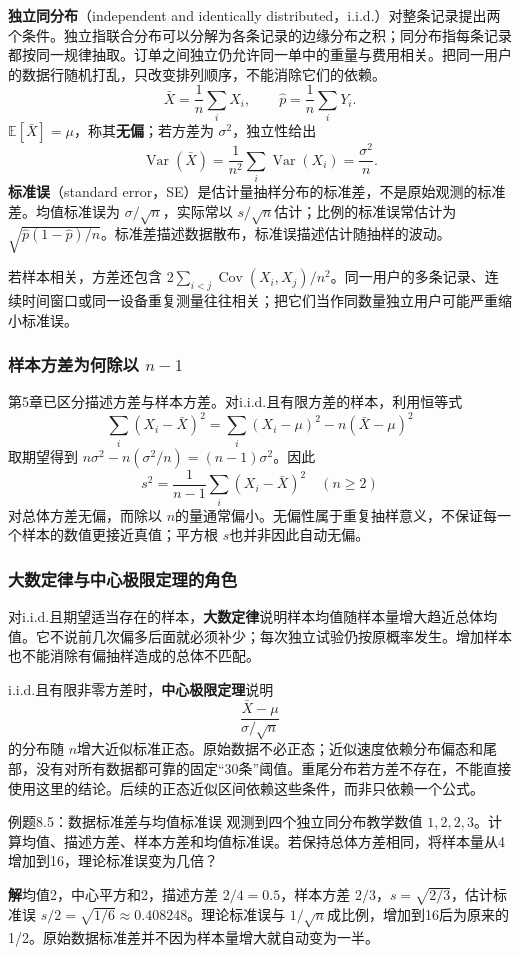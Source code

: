 \documentclass[UTF8,fontset=none,zihao=-4,a4paper]{ctexart}
\newcommand{\term}[1]{\textbf{#1}}
\newcommand{\sol}{\par\noindent\textbf{解}\quad}
\numberwithin{equation}{section}
\numberwithin{figure}{section}
\begin{document}
\term{独立同分布}（independent and identically distributed，i.i.d.）对整条记录提出两个条件。独立指联合分布可以分解为各条记录的边缘分布之积；同分布指每条记录都按同一规律抽取。订单之间独立仍允许同一单中的重量与费用相关。把同一用户的数据行随机打乱，只改变排列顺序，不能消除它们的依赖。
\[
 \bar X=\frac1n\sum_iX_i,\qquad
 \hat p=\frac1n\sum_iY_i.
\]
$\mathbb E[\bar X]=\mu$，称其\term{无偏}；若方差为 $\sigma^2$，独立性给出
\[
 \operatorname{Var}(\bar X)=\frac1{n^2}\sum_i\operatorname{Var}(X_i)=\frac{\sigma^2}{n}.
\]
\term{标准误}（standard error，SE）是估计量抽样分布的标准差，不是原始观测的标准差。均值标准误为 $\sigma/\sqrt n$，实际常以 $s/\sqrt n$估计；比例的标准误常估计为 $\sqrt{\hat p(1-\hat p)/n}$。标准差描述数据散布，标准误描述估计随抽样的波动。

若样本相关，方差还包含 $2\sum_{i<j}\operatorname{Cov}(X_i,X_j)/n^2$。同一用户的多条记录、连续时间窗口或同一设备重复测量往往相关；把它们当作同数量独立用户可能严重缩小标准误。

\subsubsection{样本方差为何除以 $n-1$}
第5章已区分描述方差与样本方差。对i.i.d.且有限方差的样本，利用恒等式
\[
 \sum_i(X_i-\bar X)^2=\sum_i(X_i-\mu)^2-n(\bar X-\mu)^2
\]
取期望得到 $n\sigma^2-n(\sigma^2/n)=(n-1)\sigma^2$。因此
\[
 s^2=\frac1{n-1}\sum_i(X_i-\bar X)^2\quad(n\ge2)
\]
对总体方差无偏，而除以 $n$的量通常偏小。无偏性属于重复抽样意义，不保证每一个样本的数值更接近真值；平方根 $s$也并非因此自动无偏。

\subsubsection{大数定律与中心极限定理的角色}
对i.i.d.且期望适当存在的样本，\term{大数定律}说明样本均值随样本量增大趋近总体均值。它不说前几次偏多后面就必须补少；每次独立试验仍按原概率发生。增加样本也不能消除有偏抽样造成的总体不匹配。

i.i.d.且有限非零方差时，\term{中心极限定理}说明
\[
 \frac{\bar X-\mu}{\sigma/\sqrt n}
\]
的分布随 $n$增大近似标准正态。原始数据不必正态；近似速度依赖分布偏态和尾部，没有对所有数据都可靠的固定“30条”阈值。重尾分布若方差不存在，不能直接使用这里的结论。后续的正态近似区间依赖这些条件，而非只依赖一个公式。

\begin{infobox}{例题8.5：数据标准差与均值标准误}
观测到四个独立同分布教学数值 $1,2,2,3$。计算均值、描述方差、样本方差和均值标准误。若保持总体方差相同，将样本量从4增加到16，理论标准误变为几倍？
\end{infobox}
\sol 均值2，中心平方和2，描述方差 $2/4=0.5$，样本方差 $2/3$，$s=\sqrt{2/3}$，估计标准误 $s/2=\sqrt{1/6}\approx0.408248$。理论标准误与 $1/\sqrt n$成比例，增加到16后为原来的1/2。原始数据标准差并不因为样本量增大就自动变为一半。
\end{document}

